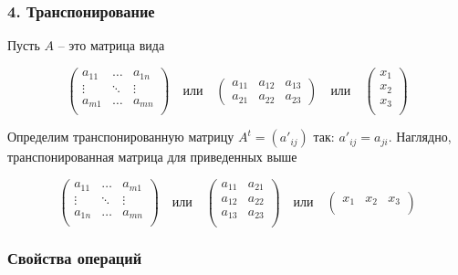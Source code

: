 \documentclass{article}
\begin{document}
\subsubsection*{4. Транспонирование} Пусть $A$ -- это матрица вида

\[
\begin{pmatrix}
	{a_{11}}&{\ldots}&{a_{1n}}\\
	{\vdots}&{\ddots}&{\vdots}\\
	{a_{m1}}&{\ldots}&{a_{mn}}\\
\end{pmatrix}\quad \text{или}\quad
\begin{pmatrix}
	{a_{11}}&{a_{12}}&{a_{13}}\\
	{a_{21}}&{a_{22}}&{a_{23}}
\end{pmatrix}\quad \text{или}\quad
\begin{pmatrix}
	{x_1}\\
	{x_2}\\
	{x_3}\\
\end{pmatrix}
\]

Определим транспонированную матрицу $A^t = (a'_{ij})$ так: $a'_{ij} = a_{ji}$. Наглядно, транспонированная матрица для приведенных выше

\[
\begin{pmatrix}
	{a_{11}}&{\ldots}&{a_{m1}}\\
	{\vdots}&{\ddots}&{\vdots}\\
	{a_{1n}}&{\ldots}&{a_{mn}}\\
\end{pmatrix}\quad\text{или}\quad
\begin{pmatrix}
	{a_{11}}&{a_{21}}\\
	{a_{12}}&{a_{22}}\\
	{a_{13}}&{a_{23}}\\
\end{pmatrix}\quad \text{или}\quad
\begin{pmatrix}
	{x_1}&{x_2}&{x_3}\\
\end{pmatrix}
\]


\subsubsection*{Свойства операций}
\end{document}
